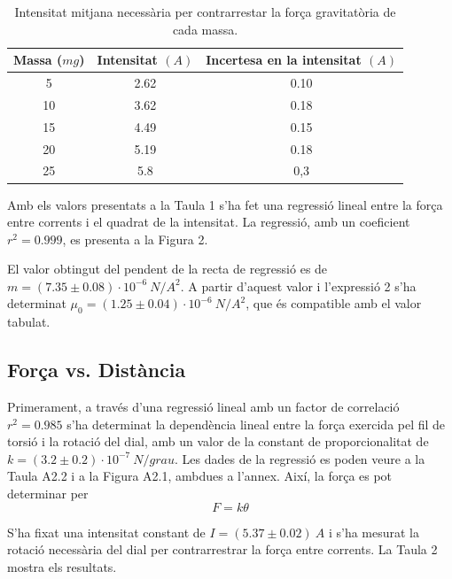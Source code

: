 \documentclass[a4paper,11pt]{article}
\begin{document}
\begin{table}
	\centering
	\caption{Intensitat mitjana necessària per contrarrestar la força gravitatòria de cada massa.}
	\vspace{0.5cm}
	\begin{tabular}{|c|c|c|}
		\hline
		\textbf{Massa ($\si{mg}$)}&\textbf{Intensitat} $\si{(A)}$& \textbf{Incertesa en la intensitat} $\si{(A)}$\\ \hline
		5 & 2.62 & 0.10 \\ \hline
			10 & 3.62 & 0.18 \\ \hline 
				15 & 4.49 & 0.15 \\ \hline 
					20 & 5.19 & 0.18 \\ \hline 
						25 & 5.8 & 0,3 \\ \hline  
	\end{tabular}
\end{table}
Amb els valors presentats a la Taula 1 s'ha fet una regressió lineal entre la força entre corrents i el quadrat de la intensitat. La regressió, amb un coeficient $r^2=0.999$, es presenta a la Figura 2.

El valor obtingut del pendent de la recta de regressió es de $m=(7.35\pm0.08)\cdot10^{-6}\ \si{N/A^2}$. A partir d'aquest valor i l'expressió 2 s'ha determinat $\mu_0=(1.25\pm0.04)\cdot10^{-6}\ \si{N/A^2}$, que és compatible amb el valor tabulat.
\subsection{Força vs. Distància}
Primerament, a través d'una regressió lineal amb un factor de correlació $r^2=0.985$ s'ha determinat la dependència lineal entre la força exercida pel fil de torsió i la rotació del dial, amb un valor de la constant de proporcionalitat de $k=(3.2\pm0.2)\cdot10^{-7}\ \si{N/grau}$. Les dades de la regressió es poden veure a la Taula A2.2 i a la Figura A2.1, ambdues a l'annex. Així, la força es pot determinar per
\begin{equation}
	F=k\theta
\end{equation}

S'ha fixat una intensitat constant de $I=(5.37\pm0.02)\ \si{A}$ i s'ha mesurat la rotació necessària del dial per contrarrestrar la força entre corrents. La Taula 2 mostra els resultats.
\end{document}
